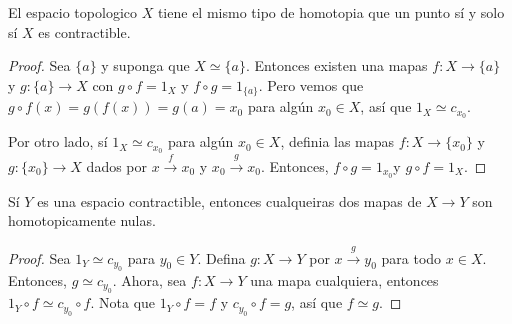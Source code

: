 \begin{theorem}\label{thm_8.17}
    El espacio topologico $X$ tiene el mismo tipo de homotopia que un punto s\'i
    y solo s\'i  $X$ es contractible.
\end{theorem}
\begin{proof}
    Sea $\{a\}$ y suponga que $X \simeq \{a\}$. Entonces existen una mapas $f:X
    \xrightarrow{} \{a\}$ y $g:\{a\} \xrightarrow{} X$ con $g \circ f=1_X$ y  $f
    \circ g = 1_{\{a\}}$. Pero vemos que $g \circ f(x)=g(f(x))=g(a)=x_0$ para
    alg\'un $x_0 \in X$, as\'i que $1_X \simeq c_{x_0}$.

    Por otro lado, s\'i $1_X \simeq c_{x_0}$ para alg\'un $x_0 \in X$, definia
    las mapas $f:X \xrightarrow{} \{x_0\}$ y $g:\{x_0\} \xrightarrow{} X$ dados por
    $x \xrightarrow{f} x_0$ y $x_0 \xrightarrow{g} x_0$. Entonces, $f \circ
    g=1_{x_0}$y $g \circ f=1_X$.
\end{proof}
\begin{corollary}
    S\'i $Y$ es una espacio contractible, entonces cualqueiras dos mapas de $X
    \xrightarrow{} Y$ son homotopicamente nulas.
\end{corollary}
\begin{proof}
    Sea $1_Y \simeq c_{y_0}$ para $y_0 \in Y$. Defina $g:X \xrightarrow{} Y$ por
    $x \xrightarrow{g} y_0$ para todo $x \in X$. Entonces,  $g \simeq c_{y_0}$.
    Ahora, sea $f:X \xrightarrow{} Y$ una mapa cualquiera, entonces  $1_Y \circ
    f \simeq c_{y_0} \circ f$. Nota que $1_Y \circ f=f$ y  $c_{y_0} \circ f=g$,
    as\'i que $f \simeq g$.
\end{proof}

